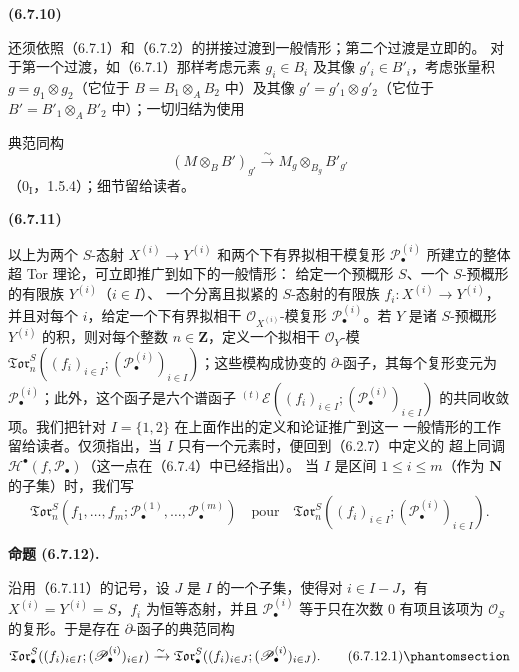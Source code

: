 \documentclass[UTF8,fontset=none,11pt,oneside,openany]{ctexbook}
\newenvironment{env}[1][]{%
  \par\medskip\noindent\textbf{(#1)}\ %
}{\par}
\newenvironment{proposition}[1][]{%
  \par\medskip\noindent\textbf{命题 (#1).}\ %
}{\par}
\newcommand{\oldpage}[2][]{%
  \hypertarget{ega-source-page-#1-#2}{}%
  \marginnote{\scriptsize\textbf{#1}~|~#2}\ignorespaces}
\let\EGAOriginalLabel\label
\renewcommand{\label}[1]{\phantomsection\EGAOriginalLabel{#1}}
\begin{document}
\begin{env}[6.7.10]
还须依照（6.7.1）和（6.7.2）的拼接过渡到一般情形；第二个过渡是立即的。
对于第一个过渡，如（6.7.1）那样考虑元素 $g_i\in B_i$ 及其像
$g'_i\in B'_i$，考虑张量积 $g=g_1\otimes g_2$（它位于
$B=B_1\otimes_A B_2$ 中）及其像 $g'=g'_1\otimes g'_2$（它位于
$B'=B'_1\otimes_A B'_2$ 中）；一切归结为使用

\oldpage[III]{164}

典范同构
\[
  (M\otimes_B B')_{g'}
  \xrightarrow{\sim}
  M_g\otimes_{B_g}B'_{g'}
\]
（$0_{\mathrm I}$，1.5.4）；细节留给读者。
\end{env}

\begin{env}[6.7.11]
以上为两个 $S$-态射 $X^{(i)}\to Y^{(i)}$ 和两个下有界拟相干模复形
$\mathscr P_\bullet^{(i)}$ 所建立的整体超 Tor 理论，可立即推广到如下的一般情形：
给定一个预概形 $S$、一个 $S$-预概形的有限族 $Y^{(i)}$（$i\in I$）、
一个分离且拟紧的 $S$-态射的有限族
$f_i:X^{(i)}\to Y^{(i)}$，并且对每个 $i$，给定一个下有界拟相干
$\mathscr O_{X^{(i)}}$-模复形 $\mathscr P_\bullet^{(i)}$。若 $Y$ 是诸
$S$-预概形 $Y^{(i)}$ 的积，则对每个整数 $n\in\mathbf Z$，定义一个拟相干
$\mathscr O_Y$-模
$\mathfrak{Tor}_n^S((f_i)_{i\in I};
(\mathscr P_\bullet^{(i)})_{i\in I})$；这些模构成协变的 $\partial$-函子，其每个复形变元为
$\mathscr P_\bullet^{(i)}$；此外，这个函子是六个谱函子
${}^{(t)}\mathscr E((f_i)_{i\in I};(\mathscr P_\bullet^{(i)})_{i\in I})$
的共同收敛项。我们把针对 $I=\{1,2\}$ 在上面作出的定义和论证推广到这一
一般情形的工作留给读者。仅须指出，当 $I$ 只有一个元素时，便回到（6.2.7）中定义的
超上同调 $\mathscr H^\bullet(f,\mathscr P_\bullet)$（这一点在（6.7.4）中已经指出）。
当 $I$ 是区间 $1\leq i\leq m$（作为 $\mathbf N$ 的子集）时，我们写
\[
  \mathfrak{Tor}_n^S
  (f_1,\ldots,f_m;
   \mathscr P_\bullet^{(1)},\ldots,\mathscr P_\bullet^{(m)})
  \quad\text{pour}\quad
  \mathfrak{Tor}_n^S
  ((f_i)_{i\in I};(\mathscr P_\bullet^{(i)})_{i\in I}).
\]
\end{env}

\begin{proposition}[6.7.12]
沿用（6.7.11）的记号，设 $J$ 是 $I$ 的一个子集，使得对
$i\in I-J$，有 $X^{(i)}=Y^{(i)}=S$，$f_i$ 为恒等态射，并且
$\mathscr P_\bullet^{(i)}$ 等于只在次数 $0$ 有项且该项为
$\mathscr O_S$ 的复形。于是存在 $\partial$-函子的典范同构
\[
  \mathfrak{Tor}_\bullet^S
  ((f_i)_{i\in I};(\mathscr P_\bullet^{(i)})_{i\in I})
  \xrightarrow{\sim}
  \mathfrak{Tor}_\bullet^S
  ((f_i)_{i\in J};(\mathscr P_\bullet^{(i)})_{i\in J}).
  \tag{6.7.12.1}\label{III.6.7.12.1.fr}
\]
\end{proposition}
\end{document}
